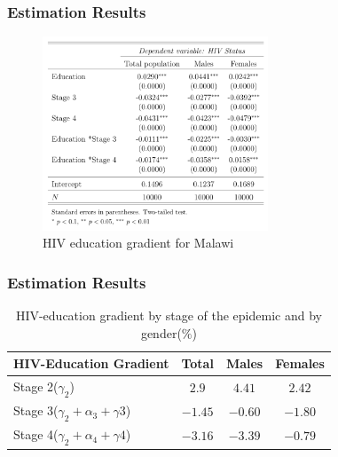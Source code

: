 \documentclass{beamer}
\begin{document}
\begin{frame}
\frametitle{Estimation Results}
\begin{figure}
  \centering
  \caption{HIV education gradient for Malawi}
   \includegraphics[width=0.6\textwidth]{edugrad.png}
 \end{figure}

\end{frame}
\begin{frame}
\frametitle{Estimation Results}
 \begin{table}[H]
 \centering
 \caption{HIV-education gradient by stage of the epidemic and by gender($\%$)}
\label{gredient}
\begin{tabular}{>{\arraybackslash}m{6cm}|c|c|c}
\hline
 \textbf{HIV-Education Gradient}& \textbf{Total} & \textbf{Males}& \textbf{Females} \\
 \hline\hline
 Stage 2($\gamma_{2}$)& $2.9$ & $4.41$& $2.42$\\
 [0.25em]
 Stage 3($\gamma_{2}+\alpha_{3}+\gamma{3}$)&$-1.45$ & $-0.60$& $-1.80$ 
 \\ 
 [0.25em]
  Stage 4($\gamma_{2}+\alpha_{4}+\gamma{4}$)
 & $-3.16$& $-3.39$& $-0.79$\\
 \hline\hline
\end{tabular}
\end{table}

\end{frame}
\end{document}
